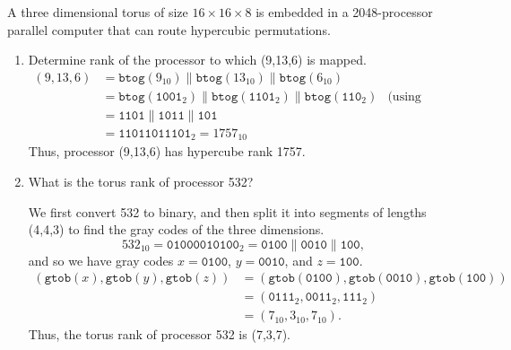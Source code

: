 \documentclass{article}
\begin{document}
A three dimensional torus of size $16 \times 16 \times 8$ is embedded in a 2048-processor parallel computer that can route hypercubic permutations.
\begin{enumerate}[label=(\alph*)]
  \item Determine rank of the processor to which (9,13,6) is mapped.
  \begin{align*}
    (9,13,6) &= \texttt{btog}(9_{10})\|\texttt{btog}(13_{10})\|\texttt{btog}(6_{10})\\
    &= \texttt{btog}(\texttt{1001}_2)\|\texttt{btog}(\texttt{1101}_2)\|\texttt{btog}(\texttt{110}_2)&\text{(using (4,4,3) bits)}\\
    &= \texttt{1101}\|\texttt{1011}\|\texttt{101}\\
    &= \texttt{11011011101}_2 = 1757_{10}
  \end{align*}
  Thus, processor (9,13,6) has hypercube rank 1757.
  \item What is the torus rank of processor 532?

    We first convert 532 to binary, and then split it into segments of lengths (4,4,3) to find the gray codes of the three dimensions. 
    $$532_{10} = \texttt{01000010100}_2 = \texttt{0100}\|\texttt{0010}\|\texttt{100},$$
    and so we have gray codes $x = \texttt{0100}$, $y = \texttt{0010}$, and $z = \texttt{100}$.
    \begin{align*}
    (\texttt{gtob}(x),\texttt{gtob}(y),\texttt{gtob}(z)) &= (\texttt{gtob}(\texttt{0100}),\texttt{gtob}(\texttt{0010}),\texttt{gtob}(\texttt{100}))\\
    &= (\texttt{0111}_2,\texttt{0011}_2,\texttt{111}_2)\\
    &= (7_{10},3_{10},7_{10}).
  \end{align*}
  Thus, the torus rank of processor 532 is (7,3,7).
\end{enumerate}
\end{document}
